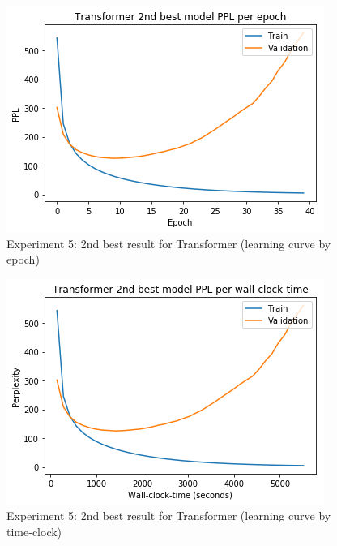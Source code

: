 \begin{itemize}
\begin{figure}[H]
	\centering
	\includegraphics[scale=0.8]{Q4-3_TR_2epoch.png}
	\caption{Experiment 5: 2nd best result for Transformer (learning curve by epoch)}
	\label{fig:fig21TR}
\end{figure}
\begin{figure}[H]
	\centering
	\includegraphics[scale=0.8]{Q4-3_TR_2time.png}
	\caption{Experiment 5: 2nd best result for Transformer (learning curve by time-clock)}
	\label{fig:fig21bTR}
\end{figure}


\end{itemize}
